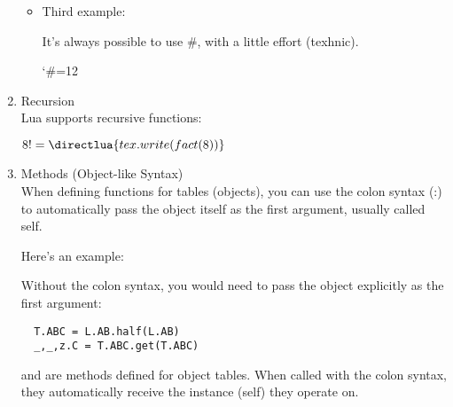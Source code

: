 \begin{enumerate}[label=(\alph*)]
\begin{itemize}
  \begin{tkzexample}[latex=.2\textwidth]
  \end{tkzexample}


\item   Third example: 

It's always possible to use \#, with a little effort (texhnic).

\begin{tkzexample}[latex=.2\textwidth]
 \bgroup
 \catcode`\#=12
 \egroup
\end{tkzexample}
\end{itemize}


\item  Recursion\\

Lua supports recursive functions:

\begin{tkzexample}[latex=.4\textwidth]
  \newcommand*{\luafact}[1]{\directlua{
    tex.write(fact(\the\numexpr(#1)\relax))}%
  }
  $8! = \luafact{8}$ 
\end{tkzexample}



\item Methods (Object-like Syntax)\\

When defining functions for tables (objects), you can use the colon syntax (:) to automatically pass the object itself as the first argument, usually called self.

Here's an example:
 

\begin{tkzexample}[latex = .2\textwidth]
\end{tkzexample}

Without the colon syntax, you would need to pass the object explicitly as the first argument:

\begin{verbatim}
  T.ABC = L.AB.half(L.AB)
  _,_,z.C = T.ABC.get(T.ABC)
\end{verbatim}

 and  are methods defined for object tables. When called with the colon syntax, they automatically receive the instance (self) they operate on.
\end{enumerate}


